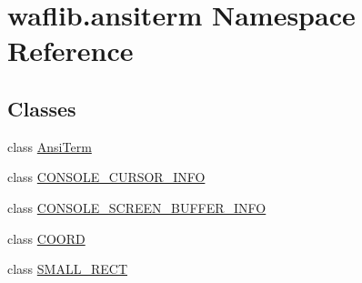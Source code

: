 \hypertarget{namespacewaflib_1_1ansiterm}{}\section{waflib.\+ansiterm Namespace Reference}
\label{namespacewaflib_1_1ansiterm}
\subsection*{Classes}
\begin{DoxyCompactItemize}
\item 
class \hyperlink{classwaflib_1_1ansiterm_1_1_ansi_term}{Ansi\+Term}
\item 
class \hyperlink{classwaflib_1_1ansiterm_1_1_c_o_n_s_o_l_e___c_u_r_s_o_r___i_n_f_o}{C\+O\+N\+S\+O\+L\+E\+\_\+\+C\+U\+R\+S\+O\+R\+\_\+\+I\+N\+FO}
\item 
class \hyperlink{classwaflib_1_1ansiterm_1_1_c_o_n_s_o_l_e___s_c_r_e_e_n___b_u_f_f_e_r___i_n_f_o}{C\+O\+N\+S\+O\+L\+E\+\_\+\+S\+C\+R\+E\+E\+N\+\_\+\+B\+U\+F\+F\+E\+R\+\_\+\+I\+N\+FO}
\item 
class \hyperlink{classwaflib_1_1ansiterm_1_1_c_o_o_r_d}{C\+O\+O\+RD}
\item 
class \hyperlink{classwaflib_1_1ansiterm_1_1_s_m_a_l_l___r_e_c_t}{S\+M\+A\+L\+L\+\_\+\+R\+E\+CT}
\end{DoxyCompactItemize}
